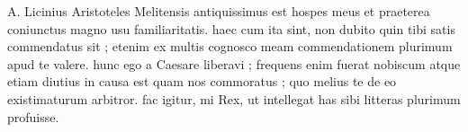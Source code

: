 


A. Licinius Aristoteles Melitensis antiquissimus est hospes meus et praeterea coniunctus magno usu familiaritatis. haec cum ita sint, non dubito quin tibi satis commendatus sit ; etenim ex multis cognosco meam commendationem plurimum apud te valere. hunc ego a Caesare liberavi ;
frequens enim fuerat nobiscum atque etiam diutius in causa est quam nos commoratus ; quo melius te de eo existimaturum arbitror. fac igitur, mi Rex, ut intellegat has sibi litteras plurimum profuisse.
